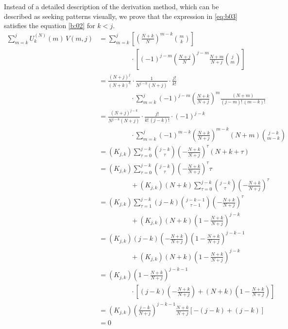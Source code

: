\documentclass{article}
\newcommand{\ppar}[1]{\left( #1 \right)}
\newcommand{\spar}[1]{\left[ #1 \right]}
\begin{document}
Instead of a detailed description of the derivation method, which can be described as seeking patterns visually, we prove that the expression in \eqref{eq:b03} satisfies the equation \eqref{b:02} for $k<j$.
%
\begin{align*}
    \sum_{m=k}^j {U_k^{(N)}}(m)\, V(m,j)
    &=
    \sum_{m=k}^j
    \spar{ \ppar{\frac{N+k}{N}}^{m-k} \binom{m}{k} }
    \\
    &\phantom{=}
    \phantom{\sum_{m=k}^j} \cdot
    \spar{ (-1)^{j-m} \ppar{\frac{N+j}{N}}^{j-m} \frac{N+m}{N+j} \binom{j}{m} }
    \\
    &=
    \frac{(N+j)^j}{(N+k)^k} \cdot \frac{1}{N^{j-k}(N+j)} \cdot \frac{j!}{k!}
    \\
    &\phantom{=}
    \phantom{\sum_{m=k}^j} \cdot
    \sum_{m=k}^j
    (-1)^{j-m} \ppar{\frac{N+k}{N+j}}^m \frac{(N+m)}{(j-m)!\, (m-k)!}
    \\
    &=
    \frac{(N+j)^{j-k}}{N^{j-k}(N+j)} \cdot \frac{j!}{k!\, (j-k)!} \cdot (-1)^{j-k}
    \\
    &\phantom{=}
    \phantom{\sum_{m=k}^j} \cdot
    \sum_{m=k}^{j}
    (-1)^{m-k} \ppar{\frac{N+k}{N+j}}^{m-k} 
    (N+m) \binom{j-k}{m-k}
    \\
    &=
    \ppar{K_{j,k} }
    \sum_{\tau=0}^{j-k}
    \binom{j-k}{\tau}
    \ppar{-\frac{N+k}{N+j}}^{\tau} 
    (N+k + \tau) 
    \\
    &=
    \ppar{K_{j,k} } 
    \sum_{\tau=0}^{j-k}
    \binom{j-k}{\tau}
    \ppar{-\frac{N+k}{N+j}}^{\tau} 
    \tau
    \\
    &\phantom{=}
    \phantom{\sum_{m=k}^j}
    +
    \ppar{K_{j,k} } \ppar{N+k}
    \sum_{\tau=0}^{j-k}
    \binom{j-k}{\tau}
    \ppar{-\frac{N+k}{N+j}}^{\tau} 
    \\
    &=
    \ppar{K_{j,k} } 
    \sum_{\tau=1}^{j-k}
    (j-k)
    \binom{j-k-1}{\tau-1}
    \ppar{-\frac{N+k}{N+j}}^{\tau} 
    \\
    &\phantom{=}
    \phantom{\sum_{m=k}^j}
    +
    \ppar{K_{j,k} } \ppar{N+k}
    \ppar{1-\frac{N+k}{N+j}}^{j-k}
    \\
    &=
    \ppar{K_{j,k} } 
    (j-k)
    \ppar{-\frac{N+k}{N+j}}
    \ppar{1-\frac{N+k}{N+j}}^{j-k-1}
    \\
    &\phantom{=}
    \phantom{\sum_{m=k}^j}
    +
    \ppar{K_{j,k} } \ppar{N+k}
    \ppar{1-\frac{N+k}{N+j}}^{j-k}
    \\
    &=
    \ppar{K_{j,k} } \ppar{1-\frac{N+k}{N+j}}^{j-k-1}
    \\
    &\phantom{=}
    \phantom{\sum_{m=k}^j}
    \cdot
    \spar{(j-k)\ppar{-\frac{N+k}{N+j}}+(N+k)\ppar{1-\frac{N+k}{N+j}}}
    \\
    &=
    \ppar{K_{j,k} } \ppar{\frac{j-k}{N+j}}^{j-k-1} 
    \frac{N+k}{N+j}
    \spar{-(j-k) + (j-k)}
    \\ &= 0
\end{align*}
\end{document}
